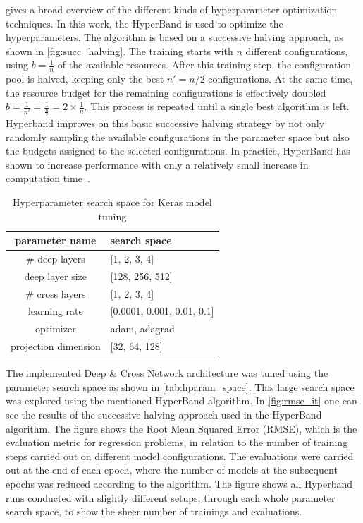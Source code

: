 \documentclass[10pt,final,journal,a4paper,oneside,twocolumn]{IEEEtran}
\begin{document}
\cite{Feurer.2019} gives a broad overview of the different kinds of hyperparameter optimization techniques. In this work, the HyperBand \cite{li2017hyperband} is used to optimize the hyperparameters. The algorithm is based on a successive halving approach, as shown in \autoref{fig:succ_halving}.
The training starts with $n$ different configurations, using $b=\frac{1}{n}$ of the available resources. After this training step, the configuration pool is halved, keeping only the best $n' = n/2$ configurations. At the same time, the resource budget for the remaining configurations is effectively doubled $b=\frac{1}{n'}=\frac{1}{\frac{n}{2}} = 2\times\frac{1}{n}$.
This process is repeated until a single best algorithm is left. Hyperband improves on this basic successive halving strategy by not only randomly sampling the available configurations in the parameter space but also the budgets assigned to the selected configurations. In practice, HyperBand has shown to increase performance with only a relatively small increase in computation time~\cite[p. 17]{Feurer.2019}.

\begin{table}[htb]
\centering
    \caption{Hyperparameter search space for Keras model tuning}
    \begin{tabular}{cl}
            \toprule
            parameter name       & search space                   \\ 
            \midrule
            \# deep layers       & {[}1, 2, 3, 4{]}               \\
            deep layer size      & {[}128, 256, 512{]}            \\
            \# cross layers      & {[}1, 2, 3, 4{]}               \\
            learning rate        & {[}0.0001, 0.001, 0.01, 0.1{]} \\
            optimizer            & adam, adagrad                  \\
            projection dimension & {[}32, 64, 128{]}              \\ 
            \bottomrule
        \end{tabular}
    \label{tab:hparam_space}
\end{table}


The implemented Deep \& Cross Network architecture was tuned using the parameter search space as shown in \autoref{tab:hparam_space}.  This large search space was explored using the mentioned HyperBand algorithm.
In \autoref{fig:rmse_it} one can see the results of the successive halving approach used in the HyperBand algorithm. The figure shows the Root Mean Squared Error (RMSE), which is the evaluation metric for regression problems, in relation to the number of training steps carried out on different model configurations. The evaluations were carried out at the end of each epoch, where the number of models at the subsequent epochs was reduced according to the algorithm. The figure shows all Hyperband runs conducted with slightly different setups, through each whole parameter search space, to show the sheer number of trainings and evaluations.
\end{document}
